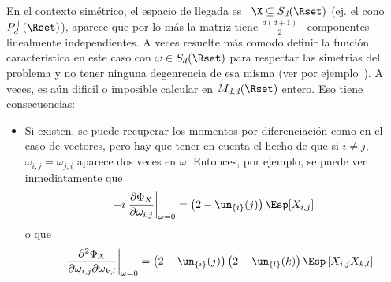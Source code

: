 

\label{Sssec:MP:MatricesAleatoriasSimetrico}

En  el  contexto  sim\'etrico, \ie  el  espacio  de  llegada  es \  $\X  \subseteq
S_d(\Rset)$ (ej.   el cono $P_d^+(\Rset)$), aparece  que por lo  m\'as la matriz
tiene  $\frac{d (d+1)}{2}$  \  componentes linealmente  independientes. A  veces
resuelte m\'as  comodo definir  la funci\'on caracter\'istica  en este  caso con
$\omega \in  S_d(\Rset)$ para  respectar las simetrias  del problema y  no tener
ninguna degenrencia  de esa misma  (ver por ejemplo~\cite{PedRic91,  And03}).  A
veces, es a\'un  dificil o imposible calcular en  $\\M_{d,d}(\Rset)$ entero. Eso
tiene consecuencias:
%
\begin{itemize}
\item Si existen,  se puede recuperar los momentos  por diferenciaci\'on como en
  el caso de  vectores, pero hay que tener  en cuenta el hecho de que  si $i \ne
  j$, $\omega_{i,j} = \omega_{j,i}$ aparece dos veces en $\omega$. Entonces, por
  ejemplo, se puede ver inmediatamente que
  \[
  -\imath \left. \frac{\partial \Phi_X}{\partial \omega_{i,j}} \right|_{\omega =
    0} = \left( 2 - \un_{\{i\}}(j) \right) \Esp[X_{i,j}]
  \]
  o que
  \[
  - \left. \frac{\partial^2 \Phi_X}{\partial \omega_{i,j} \partial \omega_{k,l}}
  \right|_{\omega  =  0}  =  \left(  2  -  \un_{\{i\}}(j)  \right)  \left(  2  -
    \un_{\{l\}}(k) \right) \Esp\left[ X_{i,j} X_{k,l} \right]
  \]
\end{itemize}

